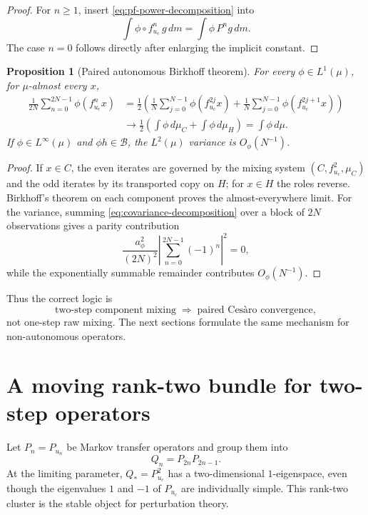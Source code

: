 \documentclass[11pt]{article}
\newtheorem{proposition}[theorem]{Proposition}
\theoremstyle{definition}
\theoremstyle{remark}
\newcommand{\uc}{u_{\mathrm c}}
\newcommand{\cB}{\mathcal B}
\begin{document}
\begin{proof}
For $n\ge1$, insert \eqref{eq:pf-power-decomposition} into
\[
    \int\phi\circ f_{\uc}^n\,g\,dm
    =\int\phi\,P^ng\,dm.
\]
The case $n=0$ follows directly after enlarging the implicit constant.
\end{proof}

\begin{proposition}[Paired autonomous Birkhoff theorem]\label{prop:paired-autonomous}
For every $\phi\in L^1(\mu)$, for $\mu$-almost every $x$,
\begin{equation}\label{eq:paired-birkhoff}
\begin{split}
    \frac1{2N}\sum_{n=0}^{2N-1}\phi(f_{\uc}^nx)
    &=\frac12\left(
       \frac1N\sum_{j=0}^{N-1}\phi(f_{\uc}^{2j}x)
       +\frac1N\sum_{j=0}^{N-1}\phi(f_{\uc}^{2j+1}x)
      \right)\\
    &\longrightarrow
      \frac12\left(\int\phi\,d\mu_C+
                    \int\phi\,d\mu_H\right)
      =\int\phi\,d\mu.
\end{split}
\end{equation}
If $\phi\in L^\infty(\mu)$ and $\phi h\in\cB$, the $L^2(\mu)$ variance is $O_\phi(N^{-1})$.
\end{proposition}

\begin{proof}
If $x\in C$, the even iterates are governed by the mixing system $(C,f_{\uc}^2,\mu_C)$ and the odd iterates by its transported copy on $H$; for $x\in H$ the roles reverse.  Birkhoff's theorem on each component proves the almost-everywhere limit.  For the variance, summing \eqref{eq:covariance-decomposition} over a block of $2N$ observations gives a parity contribution
\[
    \frac{a_\phi^2}{(2N)^2}
    \left|\sum_{n=0}^{2N-1}(-1)^n\right|^2=0,
\]
while the exponentially summable remainder contributes $O_\phi(N^{-1})$.
\end{proof}

Thus the correct logic is
\[
    \text{two-step component mixing}
    \;\Longrightarrow\;
    \text{paired Ces\`aro convergence},
\]
not one-step raw mixing.  The next sections formulate the same mechanism for non-autonomous operators.

\section{A moving rank-two bundle for two-step operators}

Let $P_n=P_{u_n}$ be Markov transfer operators and group them into
\begin{equation}\label{eq:block-operators}
    Q_n=P_{2n}P_{2n-1}.
\end{equation}
At the limiting parameter, $Q_*=P_{\uc}^2$ has a two-dimensional $1$-eigenspace, even though the eigenvalues $1$ and $-1$ of $P_{\uc}$ are individually simple.  This rank-two cluster is the stable object for perturbation theory.
\end{document}
